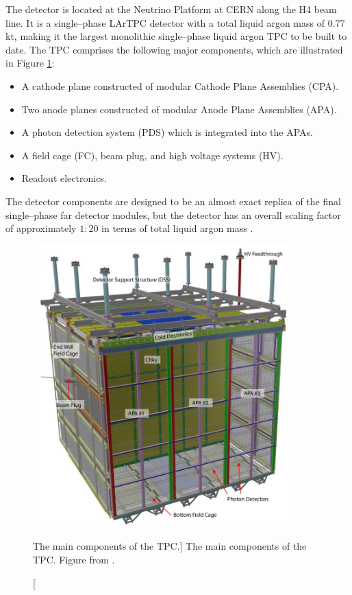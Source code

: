 The \protodune{} detector is located at the Neutrino Platform at CERN along the
H4 beam line. It is a single--phase LArTPC detector with a total liquid argon 
mass of 0.77 kt, making it the largest monolithic single--phase liquid argon TPC
to be built to date. The TPC comprises the following major components, which 
are illustrated in Figure \ref{fig:pdsp_tpc}:
\begin{itemize}
	\item A cathode plane constructed of modular Cathode Plane Assemblies (CPA).
	\item Two anode planes constructed of modular Anode Plane Assemblies (APA).
	\item A photon detection system (PDS) which is integrated into the APAs.
	\item A field cage (FC), beam plug, and high voltage systems (HV).
	\item Readout electronics.
\end{itemize}
The detector components are designed to be an almost exact replica of the final 
single--phase far detector modules, but the detector has an overall scaling 
factor of approximately $1:20$ in terms of total liquid argon mass 
\cite{Abi2017}.

\begin{figure}

	\centering

	\includegraphics[width=0.9\textwidth]{figures/pdsp_tpc.jpg}

	\caption
	[The main components of the \protodune{} TPC.]
	{The main components of the \protodune{} TPC. Figure from \cite{Abi2017}.}

	\label{fig:pdsp_tpc}

\end{figure}

